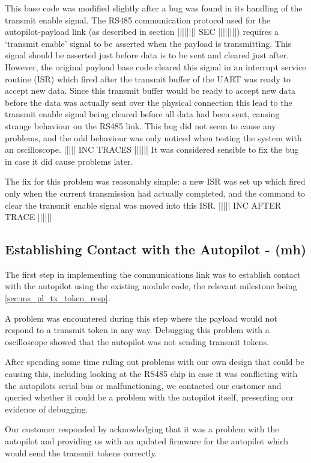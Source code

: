 This base code was modified slightly after a bug was found in its handling of 
the transmit enable signal. The RS485 communication protocol used for the 
autopilot-payload link (as described in section |||||||| SEC ||||||||) 
requires a `transmit enable' signal to be asserted when the payload is 
transmitting. This signal should be asserted just before data is to be sent 
and cleared just after. However, the original payload base code cleared this 
signal in an interrupt service routine (ISR) which fired after the transmit 
buffer of the UART was ready to accept new data. Since this transmit buffer 
would be ready to accept new data before the data was actually sent over the
physical connection this lead to the transmit enable signal being cleared
before all data had been sent, causing strange behaviour on the RS485 link.
This bug did not seem to cause any problems, and the odd behaviour was only
noticed when testing the system with an oscilloscope. ||||| INC TRACES ||||||
It was considered sensible to fix the bug in case it did cause problems later.

The fix for this problem was reasonably simple: a new ISR was set up which 
fired only when the current transmission had actually completed, and the 
command to clear the transmit enable signal was moved into this ISR.
||||| INC AFTER TRACE ||||||

\subsection{Establishing Contact with the Autopilot - (mh)}

The first step in implementing the communications link was to establish contact with
the autopilot using the existing module code, the relevant milestone being
\ref{sec:ms_pl_tx_token_resp}. 

A problem was encountered during this step where the payload would not 
respond to a transmit token in any way. Debugging this problem with a 
oscilloscope showed that the autopilot was not sending transmit tokens.

After spending some time ruling out problems with our own design that could be
causing this, including looking at the RS485 chip in case it was conflicting with the
autopilots serial bus or malfunctioning, we contacted our customer and queried 
whether it could be a problem with the autopilot itself, presenting our evidence of
debugging.

Our customer responded by acknowledging that it was a problem with the autopilot
and providing us with an updated firmware for the autopilot
which would send the transmit tokens correctly.

